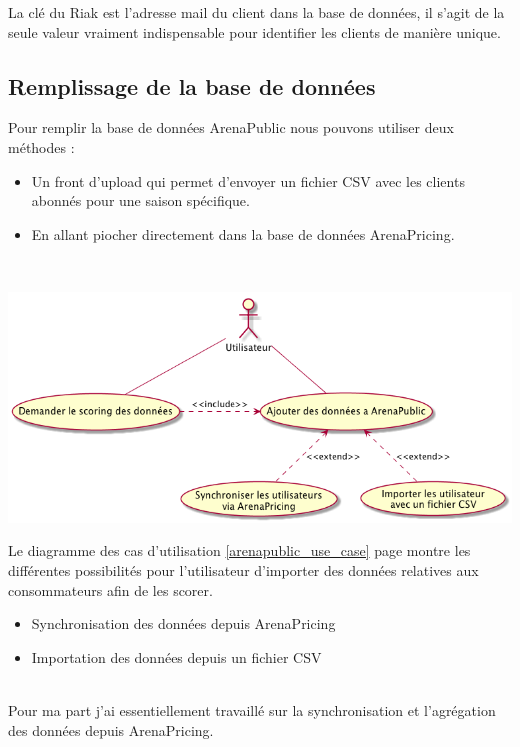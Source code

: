 La clé du Riak est l'adresse mail du client dans la base de données, il s'agit de la seule valeur vraiment indispensable pour identifier les clients de manière unique.

\subsection{Remplissage de la base de données}

Pour remplir la base de données ArenaPublic nous pouvons utiliser deux méthodes : 
\begin{itemize}
  \item[\textbullet] Un front d'upload qui permet d'envoyer un fichier CSV avec les clients abonnés pour une saison spécifique.
  \item[\textbullet] En allant piocher directement dans la base de données ArenaPricing.
  \end{itemize} \
  
\begin{center}
\includegraphics[scale=0.6]{images/arenapublic-use-case.png}
\label{arenapublic_use_case}
\end{center}

Le diagramme des cas d'utilisation \ref{arenapublic_use_case} page \pageref{arenapublic_use_case} montre les différentes possibilités pour l'utilisateur d'importer des données relatives aux consommateurs afin de les scorer.
\begin{itemize}
	\item[\textbullet] Synchronisation des données depuis ArenaPricing 
	\item[\textbullet] Importation des données depuis un fichier CSV 
\end{itemize}
\leavevmode \\

Pour ma part j'ai essentiellement travaillé sur la synchronisation et l'agrégation des données depuis ArenaPricing. 
\\

